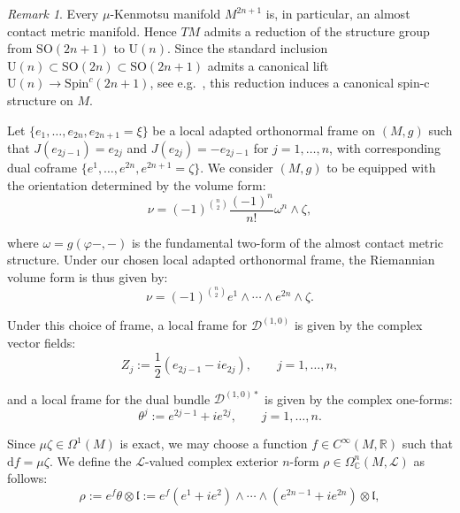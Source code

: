 \documentclass[10pt,a4paper,twoside,reqno]{amsart}
\theoremstyle{plain}
\theoremstyle{definition}
\theoremstyle{remark}
\newtheorem{remark}[thm]{Remark}
\def\dd{\mathrm{d}}
\def\dd{\mathrm{d}}
\begin{document}
\begin{remark}
\label{remark:canonical-spinc}
Every $\mu$-Kenmotsu manifold $M^{2n+1}$ is, in particular, an almost contact metric manifold. Hence $TM$ admits a reduction of the structure group from $\mathrm{SO}(2n+1)$ to $\mathrm{U}(n)$. Since the standard inclusion $\mathrm{U}(n)\subset\mathrm{SO}(2n)\subset \mathrm{SO}(2n+1)$ admits a canonical lift $\mathrm{U}(n)\to\mathrm{Spin}^{c}(2n+1)$, see e.g.~\cite{Spin89}, this reduction induces a canonical spin-c structure on $M$.
\end{remark}

\noindent
Let $\{e_1,\ldots,e_{2n},e_{2n+1}=\xi\}$ be a local adapted orthonormal frame on $(M,g)$ such that $J(e_{2j-1}) = e_{2j}$ and $J(e_{2j}) = -e_{2j-1}$ for $j=1, \ldots, n$, with corresponding dual coframe $\{e^1,\ldots,e^{2n},e^{2n+1}=\zeta\}$. We consider $(M,g)$ to be equipped with the orientation determined by the volume form:
\begin{equation*}
\nu = (-1)^{\binom{n}{2}} \frac{(-1)^n}{n!} \omega^n \wedge \zeta,
\end{equation*}

where $\omega=g(\varphi-,-)$ is the fundamental two-form of the almost contact metric structure. Under our chosen local adapted orthonormal frame, the Riemannian volume form is thus given by:
\begin{equation*}
\nu = (-1)^{\binom{n}{2}} e^1 \wedge \cdots \wedge e^{2n} \wedge \zeta.
\end{equation*}

Under this choice of frame, a local frame for $\mathcal{D}^{(1,0)}$ is given by the complex vector fields:
\begin{equation*}
Z_j := \frac{1}{2}(e_{2j-1} - ie_{2j}), \qquad j=1, \ldots, n,
\end{equation*}

\noindent
and a local frame for the dual bundle $\mathcal{D}^{(1,0)\ast}$ is given by the complex one-forms:
\begin{equation*}
\theta^j := e^{2j-1} + ie^{2j}, \qquad j=1, \ldots, n.
\end{equation*}

\noindent
Since $\mu\zeta\in \Omega^1(M)$ is exact, we may choose a function $f \in C^\infty(M, \mathbb{R})$ such that $\dd f = \mu\zeta$. We define the $\mathcal{L}$-valued complex exterior $n$-form $\rho \in \Omega^n_{\mathbb{C}}(M, \mathcal{L})$ as follows:
\begin{equation*}
\rho := e^f \theta \otimes \mathfrak{l} := e^f(e^1 + i e^2) \wedge \cdots \wedge (e^{2n-1} + i e^{2n}) \otimes \mathfrak{l},
\end{equation*}
\end{document}
